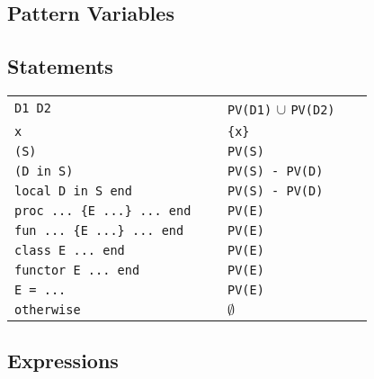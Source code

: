 \documentclass[a4paper]{memoir}
\begin{document}
\begin{appendices} 

\chapter{Pattern Variables}\label{appendix:patternvariables}
\section{Statements}

\begin{tabular} {l l}
\lstinline!D1 D2                      ! & \lstinline!PV(D1)! $\cup$ \lstinline!PV(D2)! \\
\lstinline!x                          ! & \lstinline!{x}!                  \\
\lstinline!(S)                        ! & \lstinline!PV(S)             ! \\
\lstinline!(D in S)                   ! & \lstinline!PV(S) - PV(D)     ! \\
\lstinline!local D in S end           ! & \lstinline!PV(S) - PV(D)     ! \\
\lstinline!proc ... {E ...} ... end   ! & \lstinline!PV(E)             ! \\
\lstinline!fun ... {E ...} ... end    ! & \lstinline!PV(E)             ! \\
\lstinline!class E ... end            ! & \lstinline!PV(E)             ! \\
\lstinline!functor E ... end          ! & \lstinline!PV(E)             ! \\
\lstinline!E = ...                    ! & \lstinline!PV(E)             ! \\
\lstinline!otherwise                  ! & $\emptyset$          \\
\end{tabular}



\section{Expressions}


\end{appendices}
\end{document}
